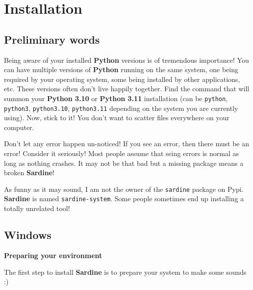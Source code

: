 \documentclass[11pt]{article}
\begin{document}
\section{Installation}
\label{sec:org63a0b5a}
\subsection{Preliminary words}
\label{sec:orgfecdcc8}

Being aware of your installed \textbf{Python} versions is of tremendous importance! You can have multiple versions of \textbf{Python} running on the same system, one being required by your operating system, some being installed by other applications, etc. These versions often don't live happily together. Find the command that will summon your \textbf{Python 3.10} or \textbf{Python 3.11} installation (can be \texttt{python}, \texttt{python3}, \texttt{python3.10}, \texttt{python3.11} depending on the system you are currently using). Now, stick to it! You don't want to scatter files everywhere on your computer.

Don't let any error happen un-noticed! If you see an error, then there must be an error! Consider it seriously! Most people assume that seing errors is normal as long as nothing crashes. It may not be that bad but a missing package means a broken \textbf{Sardine}!

As funny as it may sound, I am not the owner of the \texttt{sardine} package on Pypi. \textbf{Sardine} is named \texttt{sardine-system}. Some people sometimes end up installing a totally unrelated tool!

\subsection{Windows}
\label{sec:org7632e56}

\textbf{Preparing your environment}

The first step to install \textbf{Sardine} is to prepare your system to make some sounds :)
\end{document}

